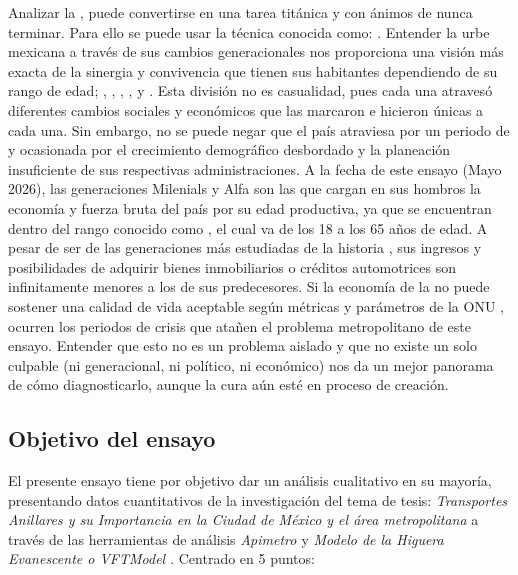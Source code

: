 Analizar la \zmvm, puede convertirse en una tarea titánica y con ánimos de nunca terminar. Para ello se puede usar la técnica conocida como: 
. Entender la urbe mexicana a través de sus cambios generacionales nos proporciona una visión más exacta de la 
sinergia y convivencia que tienen sus habitantes dependiendo de su rango de edad; , 
, , ,  y 
 \cite{pew_generations_2019}. Esta división no es casualidad, pues cada una atravesó diferentes cambios sociales 
y económicos que las marcaron e hicieron únicas a cada una. Sin embargo, no se puede negar que el país atraviesa por un periodo de  
y  ocasionada por el crecimiento demográfico desbordado y la planeación insuficiente de sus respectivas administraciones. 
A la fecha de este ensayo (Mayo 2026), las generaciones Milenials y Alfa son las que cargan en sus hombros la economía y fuerza bruta del país por su edad 
productiva, ya que se encuentran dentro del rango conocido como , el cual va de los 18 a los 65 años de edad. 
A pesar de ser de las generaciones más estudiadas de la historia \cite{pew_generations_2019}, sus ingresos y posibilidades de adquirir bienes inmobiliarios o 
créditos automotrices son infinitamente menores a los de sus predecesores. Si la economía de la  no puede sostener una calidad de vida aceptable 
según métricas y parámetros de la ONU \cite{undp_hdr_2024}, ocurren los periodos de crisis que atañen el problema metropolitano de este ensayo. 
Entender que esto no es un problema aislado y que no existe un solo culpable (ni generacional, ni político, ni económico) nos da un mejor panorama de cómo
diagnosticarlo, aunque la cura aún esté en proceso de creación. 


\subsection{Objetivo del ensayo}
\label{ssec:objetivo-ensayo}

El presente ensayo tiene por objetivo dar un análisis cualitativo en su mayoría, presentando datos cuantitativos de la investigación del tema de tesis:
\textit{Transportes Anillares y su Importancia en la Ciudad de México y el área metropolitana} \cite{galigaribaldi_tesis} a través de las herramientas de
análisis \textit{Apimetro \cite{galigaribaldi_apimetro}} y \textit{Modelo de la Higuera Evanescente o VFTModel \cite{galigaribaldi_vftmodel}}. Centrado en 5 puntos:

